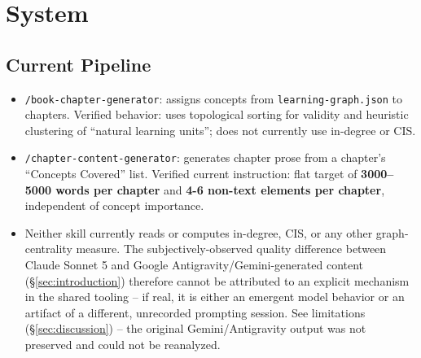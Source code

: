 
\section{System}
\label{sec:system}

\subsection{Current Pipeline}
\begin{itemize}
    \item \texttt{/book-chapter-generator}: assigns concepts from
          \texttt{learning-graph.json} to chapters. Verified behavior: uses
          topological sorting for validity and heuristic clustering of ``natural
          learning units''; does not currently use in-degree or CIS.
    \item \texttt{/chapter-content-generator}: generates chapter prose from a
          chapter's ``Concepts Covered'' list. Verified current instruction: flat
          target of \textbf{3000--5000 words per chapter} and \textbf{4-6 non-text
          elements per chapter}, independent of concept importance.
    \item Neither skill currently reads or computes in-degree, CIS, or any other
          graph-centrality measure. The subjectively-observed quality difference
          between Claude Sonnet 5 and Google Antigravity/Gemini-generated content
          (\S\ref{sec:introduction}) therefore cannot be attributed to an explicit
          mechanism in the shared tooling -- if real, it is either an emergent
          model behavior or an artifact of a different, unrecorded prompting
          session. See limitations (\S\ref{sec:discussion}) -- the original
          Gemini/Antigravity output was not preserved and could not be reanalyzed.
\end{itemize}

